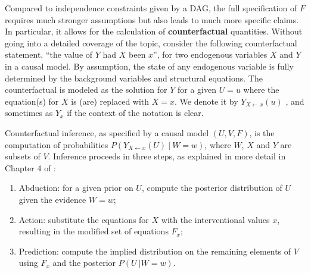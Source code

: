 Compared to independence constraints given by a DAG, the full
specification of $F$ requires much stronger assumptions but also leads
to much more specific claims. In particular, it allows for the
calculation of {\bf counterfactual} quantities. Without going into a
detailed coverage of the topic, consider the following counterfactual
statement, ``the value of $Y$ had $X$ been $x$'', for two endogenous
variables $X$ and $Y$ in a causal model. By assumption, the state of
any endogenous variable is fully determined by
the background variables and structural equations. The counterfactual is
modeled as the solution for $Y$ for a given $U = u$ where the equation(s)
for $X$ is (are) replaced with $X = x$.  We denote it by $Y_{X \leftarrow x}(u)$
\cite{pearl:00}, and sometimes as $Y_x$ if the context of the notation is clear.

Counterfactual inference, as specified by a causal model $(U, V, F)$,
is the computation of probabilities $P(Y_{X \leftarrow x}(U)\ |\ W =
w)$, where $W$, $X$ and $Y$ are subsets of $V$. Inference proceeds in
three steps, as explained in more detail in Chapter 4 of
\cite{pearl:16}:
\begin{enumerate}
\item Abduction: for a given prior on $U$, compute the posterior
  distribution of $U$ given the evidence $W = w$;
\item Action: substitute the equations for $X$ with the interventional values $x$, resulting
     in the modified set of equations $F_x$;
\item Prediction: compute the implied distribution on the remaining elements of $V$
     using $F_x$ and the posterior $P(U\ | W = w)$.
\end{enumerate}


